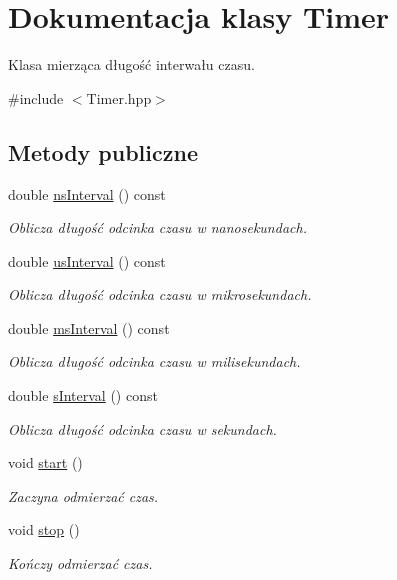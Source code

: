 \hypertarget{class_timer}{\section{Dokumentacja klasy Timer}
\label{class_timer}
}


Klasa mierząca długość interwału czasu.  




{\ttfamily \#include $<$Timer.\-hpp$>$}

\subsection*{Metody publiczne}
\begin{DoxyCompactItemize}
\item 
double \hyperlink{class_timer_a2dd502fa5a0d6827da5578e292d96942}{ns\-Interval} () const 
\begin{DoxyCompactList}\small\item\em Oblicza długość odcinka czasu w nanosekundach. \end{DoxyCompactList}\item 
double \hyperlink{class_timer_a124742f864cf5913b63807ff8b3a6c7a}{us\-Interval} () const 
\begin{DoxyCompactList}\small\item\em Oblicza długość odcinka czasu w mikrosekundach. \end{DoxyCompactList}\item 
double \hyperlink{class_timer_a82a672b3866241f01351b4581113aba3}{ms\-Interval} () const 
\begin{DoxyCompactList}\small\item\em Oblicza długość odcinka czasu w milisekundach. \end{DoxyCompactList}\item 
double \hyperlink{class_timer_acabb155ab43e81e2fc8c568d73d1d1d3}{s\-Interval} () const 
\begin{DoxyCompactList}\small\item\em Oblicza długość odcinka czasu w sekundach. \end{DoxyCompactList}\item 
void \hyperlink{class_timer_a3a8b5272198d029779dc9302a54305a8}{start} ()
\begin{DoxyCompactList}\small\item\em Zaczyna odmierzać czas. \end{DoxyCompactList}\item 
void \hyperlink{class_timer_a63f0eb44b27402196590a03781515dba}{stop} ()
\begin{DoxyCompactList}\small\item\em Kończy odmierzać czas. \end{DoxyCompactList}\end{DoxyCompactItemize}
